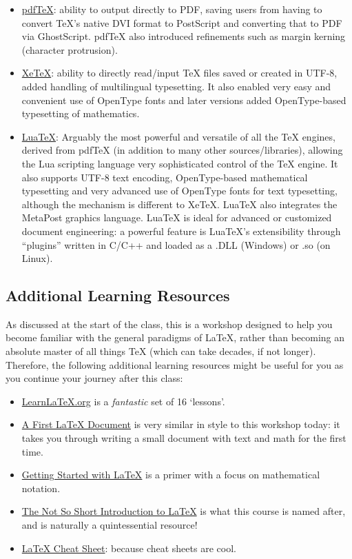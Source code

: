 \documentclass[a4paper, 12pt]{article}
\begin{document}
\begin{itemize}
\item \href{www.tug.org/applications/pdftex}{pdfTeX}: ability to output directly to PDF, saving users from having to convert TeX’s native DVI format to PostScript and converting that to PDF via GhostScript. pdfTeX also introduced refinements such as margin kerning (character protrusion).
\item \href{http://tug.org/xetex}{XeTeX}: ability to directly read/input TeX files saved or created in UTF-8, added handling of multilingual typesetting. It also enabled very easy and convenient use of OpenType fonts and later versions added OpenType-based typesetting of mathematics.
\item \href{www.luatex.org}{LuaTeX}: Arguably the most powerful and versatile of all the TeX engines, derived from pdfTeX (in addition to many other sources/libraries), allowing the Lua scripting language very sophisticated control of the TeX engine. It also supports UTF-8 text encoding, OpenType-based mathematical typesetting and very advanced use of OpenType fonts for text typesetting, although the mechanism is different to XeTeX. LuaTeX also integrates the MetaPost graphics language. LuaTeX is ideal for advanced or customized document engineering: a powerful feature is LuaTeX’s extensibility through “plugins” written in C/C++ and loaded as a .DLL (Windows) or .so (on Linux).
\end{itemize}

\subsection{Additional Learning Resources}

As discussed at the start of the class, this is a workshop designed to help you become familiar with the general paradigms of \LaTeX{}, rather than becoming an absolute master of all things \TeX{} (which can take decades, if not longer). Therefore, the following additional learning resources might be useful for you as you continue your journey after this class:

\begin{itemize}
\item \href{https://www.learnlatex.org/en/}{\color{red}LearnLaTeX.org} is a \emph{fantastic} set of 16 `lessons'.
\item \href{https://ctan.org/pkg/first-latex-doc}{\color{red}A First LaTeX Document} is very similar in style to this workshop today: it takes you through writing a small document with text and math for the first time. 
\item \href{https://www.maths.tcd.ie/~dwilkins/LaTeXPrimer/}{\color{red}Getting Started with LaTeX} is a primer with a focus on mathematical notation.
\item \href{https://tobi.oetiker.ch/lshort/lshort.pdf}{\color{red}The Not So Short Introduction to \LaTeX{}} is what this course is named after, and is naturally a quintessential resource!
\item \href{http://www.stdout.org/~winston/latex/}{\color{red}LaTeX Cheat Sheet}: because cheat sheets are cool.
\end{itemize}
\end{document}
